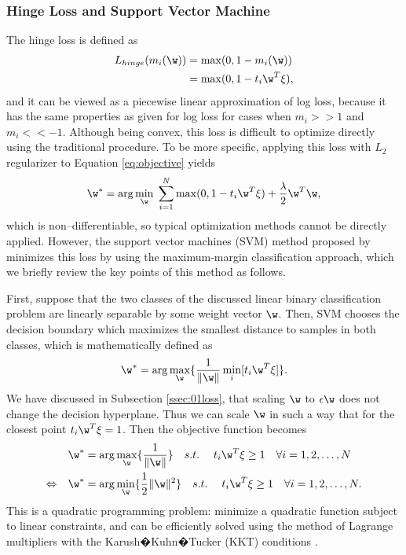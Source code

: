 \subsubsection{Hinge Loss and Support Vector Machine}

The hinge loss is defined as
\[ \begin{split}
L_{hinge}(m_i(\w)) &= \max(0, 1 - m_i(\w)) \\
&= \max(0, 1 - t_i \w^T \xi),
\end{split} \] 
and it can be viewed as a piecewise linear approximation of log loss, because it has the same properties as given for log loss for cases when $m_i >> 1$ and $m_i << -1$. Although being convex, this loss is difficult to optimize directly using the traditional procedure. To be more specific, applying this loss with $L_2$ regularizer to Equation \ref{eq:objective} yields 
\begin{equation}
\label{eq:svmobj}
\w^* = \arg\min_{\w} \; \sum_{i=1}^{N} \max(0,1 - t_i\w^T\xi)  + \frac{\lambda}{2} \w^T\w,
\end{equation}
which is non--differentiable, so typical optimization methods cannot be directly applied. However, the support vector machines (SVM) method proposed by \cite{Vapnik} minimizes this loss by using the maximum-margin classification approach, which we briefly review the key points of this method as follows.

First, suppose that the two classes of the discussed linear binary classification problem are linearly separable by some weight vector $\w$. Then, SVM chooses the decision boundary which maximizes the smallest distance to samples in both classes, which is mathematically defined as
$$ \w^* = \arg \max_{\w} \{ \frac{1}{\|\w\|} \min_i [t_i\w^T \xi] \}. $$
We have discussed in Subsection \ref{ssec:01loss}, that scaling $\w$ to $\epsilon \w$ does not change the decision hyperplane. Thus we can scale $\w$ in such a way that for the closest point $t_i\w^T \xi = 1$. Then the objective function becomes 
\[ \begin{split}
& \w^* = \arg \max_{\w} \{ \frac{1}{\|\w\|} \} \quad s.t. \quad \;t_i\w^T \xi \geq 1 \quad \forall i = 1, 2, \dots, N \\
\Leftrightarrow \quad &  \w^* = \arg \min_{\w} \{ \frac{1}{2}\|\w\|^2 \} \quad s.t. \quad \;t_i\w^T \xi \geq 1 \quad \forall i = 1, 2, \dots, N.
\end{split} \] 
This is a quadratic programming problem: minimize a quadratic function subject to linear constraints, and can be efficiently solved using the method of Lagrange multipliers with the Karush�Kuhn�Tucker (KKT) conditions \cite{Kuhn}. 

